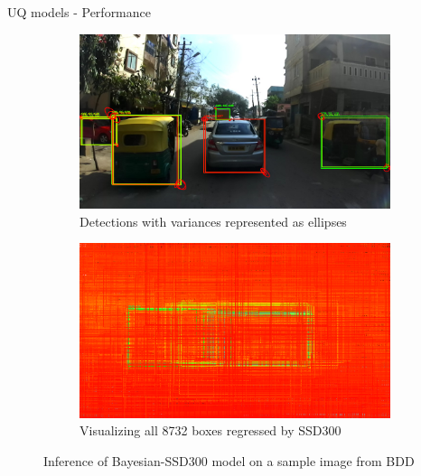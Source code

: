 \documentclass[10pt, aspectratio=169]{beamer}
\begin{document}
\begin{frame}[allowframebreaks]{UQ models - Performance}
       \begin{figure}[H]
        \captionsetup[table]{skip=0pt}
           \centering
           \begin{subfigure}[t]{0.495\textwidth}
               \centering
               \includegraphics[width=\textwidth]{images/det_images/idd_subens_variances_1.png}
               \caption{Detections with variances represented as ellipses}
           \end{subfigure}
           \begin{subfigure}[t]{0.495\textwidth}
               \centering
               \includegraphics[width=\textwidth]{images/det_images/all_subens_idd_0.png}
               \caption{Visualizing all 8732 boxes regressed by SSD300}
           \end{subfigure}
           \caption{Inference of Bayesian-SSD300 model on a sample image from BDD}
       \end{figure}
\end{frame}
\end{document}
